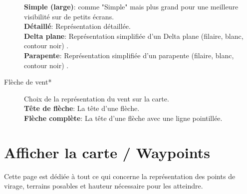\begin{description}
  {\bf Simple (large)}: comme "Simple" mais plus grand pour une meilleure visibilité sur de petits écrans.\\
  {\bf Détaillé}: Représentation détaillée.\\
 {\bf Delta plane}: Représentation simplifiée d'un Delta plane (filaire, blanc, contour noir) .\\
 {\bf Parapente}: Représentation simplifiée d'un parapente (filaire, blanc, contour noir) .
\item[Flèche de vent*]  Choix de la représentation du vent sur la carte. \\
  {\bf Tête de flèche}: La tête d'une flèche. \\
  {\bf Flèche complète}: La tête d'une flèche avec une ligne pointillée.
\end{description}


\section{Afficher la carte / Waypoints}\label{sec:waypoint-display}

Cette page est dédiée à tout ce qui concerne la représentation des points de virage, terrains posables et hauteur nécessaire pour les atteindre.

